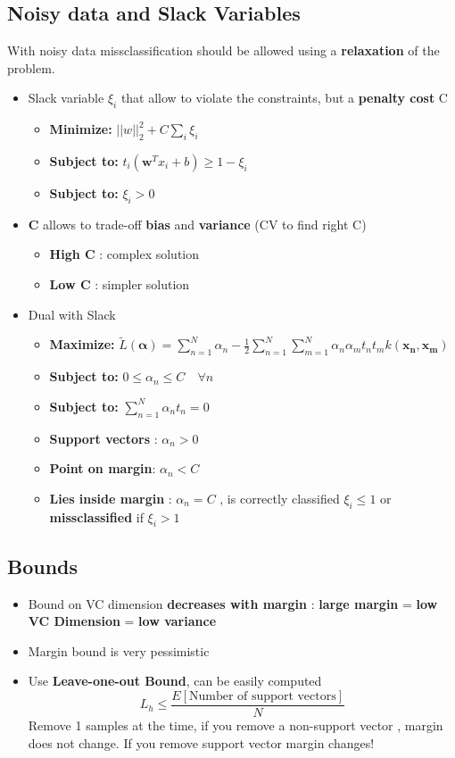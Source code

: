 \documentclass[12pt]{article} %
\begin{document}
\subsection{Noisy data and Slack Variables}
With noisy data missclassification should be allowed using a \textbf{relaxation} of the problem.
\begin{itemize}
\item Slack variable $\xi_i$ that allow to violate the constraints, but a \textbf{penalty cost} C
\begin{itemize}
\item \textbf{Minimize: } $||w||^2_2 + C \sum \limits_i \xi_i$
\item \textbf{Subject to: } $t_i (\bm{w}^Tx_i + b) \geq 1-\xi_i$
\item \textbf{Subject to: } $\xi_i> 0$
\end{itemize}

\item \textbf{C} allows to trade-off \textbf{bias} and \textbf{variance} (CV to find right C)
\begin{itemize}
\item \textbf{High C} : complex solution
\item \textbf{Low C} : simpler solution
\end{itemize}

\item Dual with Slack
\begin{itemize}
\item \textbf{Maximize: } $\tilde{L}(\bm{\alpha})= \sum \limits_{n=1}^N \alpha_n - \frac{1}{2}\sum \limits_{n=1}^N \sum \limits_{m=1}^N \alpha_n\alpha_mt_nt_mk(\bm{x_n,x_m})$
\item \textbf{Subject to:} $0 \leq \alpha_n \leq C \quad \forall n$
\item \textbf{Subject to:} $\sum \limits_{n=1}^N \alpha_nt_n=0$
\item \textbf{Support vectors} : $\alpha_n > 0$
\item \textbf{Point on margin}: $\alpha_n < C$
\item \textbf{Lies inside margin} : $\alpha_n = C$ , is correctly classified $\xi_i \leq 1$ or \textbf{missclassified} if $\xi_i >1$
\end{itemize}
\end{itemize}

\subsection{Bounds}
\begin{itemize}
\item Bound on VC dimension \textbf{decreases with margin} : \textbf{large margin} = \textbf{low VC Dimension} = \textbf{low variance}

\item Margin bound is very pessimistic
\item Use \textbf{Leave-one-out Bound}, can be easily computed
$$ L_h \leq \frac{E[\text{Number of support vectors}]}{N}$$ 
Remove 1 samples at the time, if you remove a non-support vector , margin does not change. If you remove support vector margin changes!
\end{itemize}
\end{document}
